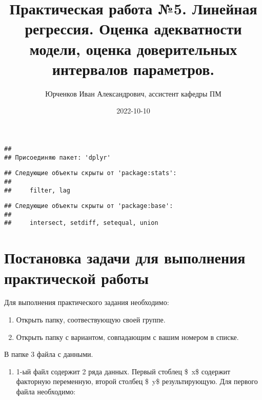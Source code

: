 \documentclass[
]{article}
\title{Практическая работа №5. Линейная регрессия. Оценка адекватности
модели, оценка доверительных интервалов параметров.}
\author{Юрченков Иван Александрович, ассистент кафедры ПМ}
\date{2022-10-10}
\providecommand{\tightlist}{%
  \setlength{\itemsep}{0pt}\setlength{\parskip}{0pt}}
\begin{document}
\maketitle

\begin{verbatim}
## 
## Присоединяю пакет: 'dplyr'
\end{verbatim}

\begin{verbatim}
## Следующие объекты скрыты от 'package:stats':
## 
##     filter, lag
\end{verbatim}

\begin{verbatim}
## Следующие объекты скрыты от 'package:base':
## 
##     intersect, setdiff, setequal, union
\end{verbatim}

\hypertarget{ux43fux43eux441ux442ux430ux43dux43eux432ux43aux430-ux437ux430ux434ux430ux447ux438-ux434ux43bux44f-ux432ux44bux43fux43eux43bux43dux435ux43dux438ux44f-ux43fux440ux430ux43aux442ux438ux447ux435ux441ux43aux43eux439-ux440ux430ux431ux43eux442ux44b}{%
\section{\texorpdfstring{\textbf{Постановка задачи для выполнения
практической
работы}}{Постановка задачи для выполнения практической работы}}\label{ux43fux43eux441ux442ux430ux43dux43eux432ux43aux430-ux437ux430ux434ux430ux447ux438-ux434ux43bux44f-ux432ux44bux43fux43eux43bux43dux435ux43dux438ux44f-ux43fux440ux430ux43aux442ux438ux447ux435ux441ux43aux43eux439-ux440ux430ux431ux43eux442ux44b}}

Для выполнения практического задания необходимо:

\begin{enumerate}
\def\labelenumi{\arabic{enumi}.}
\item
  Открыть папку, соотвествующую своей группе.
\item
  Открыть папку с вариантом, совпадающим с вашим номером в списке.
\end{enumerate}

В папке 3 файла с данными.

\begin{enumerate}
\def\labelenumi{\arabic{enumi}.}
\tightlist
\item
  1-ый файл содержит 2 ряда данных. Первый стоблец \$~x\$ содержит
  факторную переменную, второй столбец \$~y\$ результирующую. Для
  первого файла необходимо:
\end{enumerate}
\end{document}
